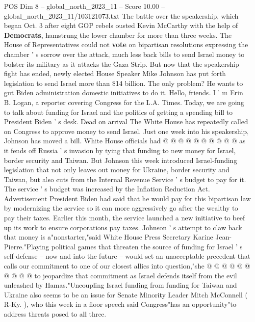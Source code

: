 \begin{textsample}{POS Dim 8 – global\_north\_2023\_11 – Score 10.00 – global\_north\_2023\_11/103121073.txt}  \label{ex:f8_pos_127}
The battle over the speakership, which began Oct. 3 after eight GOP rebels ousted Kevin McCarthy with the help of \textbf{Democrats}, hamstrung the lower chamber for more than three weeks.
The House of Representatives could not \textbf{vote} on bipartisan resolutions expressing the chamber ' s sorrow over the attack, much less back bills to send Israel money to bolster its military as it attacks the Gaza Strip.
But now that the speakership fight has ended, newly elected House Speaker Mike Johnson has put forth legislation to send Israel more than \$14 billion.
The only problem?
He wants to gut Biden administration domestic initiatives to do it.
Hello, friends.
I ' m Erin B.
Logan, a reporter covering Congress for the L.A.
Times.
Today, we are going to talk about funding for Israel and the politics of getting a spending bill to President Biden ' s desk.
Dead on arrival The White House has repeatedly called on Congress to approve money to send Israel.
Just one week into his speakership, Johnson has moved a bill.
White House officials had @ @ @ @ @ @ @ @ @ @ as it fends off Russia ' s invasion by tying that funding to new money for Israel, border security and Taiwan.
But Johnson this week introduced Israel-funding legislation that not only leaves out money for Ukraine, border security and Taiwan, but also cuts from the Internal Revenue Service ' s budget to pay for it.
The service ' s budget was increased by the Inflation Reduction Act.
Advertisement President Biden had said that he would pay for this bipartisan law by modernizing the service so it can more aggressively go after the wealthy to pay their taxes.
Earlier this month, the service launched a new initiative to beef up its work to ensure corporations pay taxes.
Johnson ' s attempt to claw back that money is a"nonstarter,"said White House Press Secretary Karine Jean-Pierre."Playing political games that threaten the source of funding for Israel ' s self-defense -- now and into the future -- would set an unacceptable precedent that calls our commitment to one of our closest allies into question,"she @ @ @ @ @ @ @ @ @ @ to jeopardize that commitment as Israel defends itself from the evil unleashed by Hamas."Uncoupling Israel funding from funding for Taiwan and Ukraine also seems to be an issue for Senate Minority Leader Mitch McConnell ( R-Ky. ), who this week in a floor speech said Congress"has an opportunity"to address threats posed to all three.

\end{textsample}

